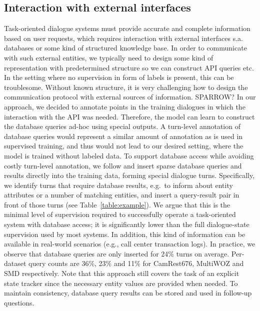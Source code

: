 \subsection{Interaction with external interfaces}
Task-oriented dialogue systems must provide accurate and complete information based on user requests, which requires interaction with external interfaces s.a. databases or some kind of structured knowledge base.
In order to communicate with such external entities, we typically need to design some kind of representation with predetermined  structure so we can construct API queries etc.
In the setting where no supervision in form of labels is present, this can be troublesome.
Without known structure, it is very challenging how to design the communication protocol with external sources of information.
SPARROW?
In our approach, we decided to annotate points in the training dialogues in which the interaction with the API was needed.
Therefore, the model can learn to construct the database queries ad-hoc using special outputs.
A turn-level annotation of database queries would represent a similar amount of annotation as is used in supervised training, and thus would not lead to our desired setting, where the model is trained without labeled data.
To support database access while avoiding costly turn-level annotation, we follow \citet{bordes2016learning} and 
insert sparse database queries and results directly into the training data, forming special dialogue turns.
Specifically, we identify turns that require database results, e.g.\ to inform about entity attributes or a number of matching entities, and insert a query-result pair in front of those turns (see Table~\ref{table:example}). We argue that this is the minimal level of supervision required to successfully operate a task-oriented system with database access; it is significantly lower than the full dialogue-state supervision used by most systems.
In addition, this kind of information can be available in real-world scenarios (e.g., call center transaction logs).
In practice, we observe that database queries are only inserted for 24\% turns on average.
Per-dataset query counts are 36\%, 23\% and 11\% for CamRest676, MultiWOZ and SMD respectively.
Note that this approach still covers the task of an explicit state tracker since the necessary entity values are provided when needed.
To maintain consistency, database query results can be stored and used in follow-up questions.
